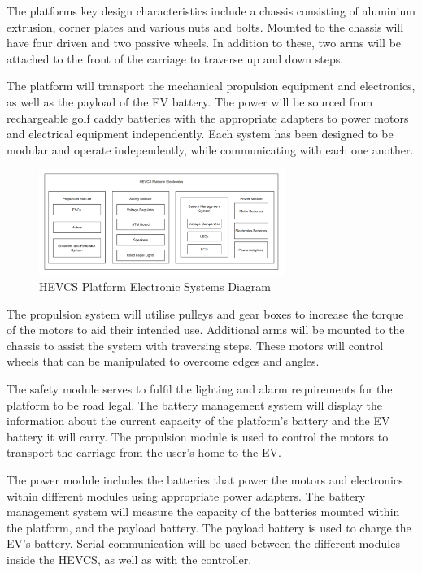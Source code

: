 \documentclass [12pt]{article}
\begin{document}
The platforms key design characteristics include a chassis consisting of aluminium extrusion, corner plates and various nuts and bolts. Mounted to the chassis will have four driven and two passive wheels. In addition to these, two arms will be attached to the front of the carriage to traverse up and down steps.

The platform will transport the mechanical propulsion equipment and electronics, as well as the payload of the EV battery. The power will be sourced from rechargeable golf caddy batteries with the appropriate adapters to power motors and electrical equipment independently. Each system has been designed to be modular and operate independently, while communicating with each one another.

\begin{figure}[h]
    \centering
    \includegraphics[width = 8cm]{PlatformHardware.png}
    \caption{HEVCS Platform Electronic Systems Diagram}
\end{figure}

The propulsion system will utilise pulleys and gear boxes to increase the torque of the motors to aid their intended use. Additional arms will be mounted to the chassis to assist the system with traversing steps. These motors will control wheels that can be manipulated to overcome edges and angles.

The safety module serves to fulfil the lighting and alarm requirements for the platform to be road legal. The battery management system will display the information about the current capacity of the platform’s battery and the EV battery it will carry. The propulsion module is used to control the motors to transport the carriage from the user’s home to the EV.

The power module includes the batteries that power the motors and electronics within different modules using appropriate power adapters. The battery management system will measure the capacity of the batteries mounted within the platform, and the payload battery. The payload battery is used to charge the EV’s battery. Serial communication will be used between the different modules inside the HEVCS, as well as with the controller. 
\end{document}
